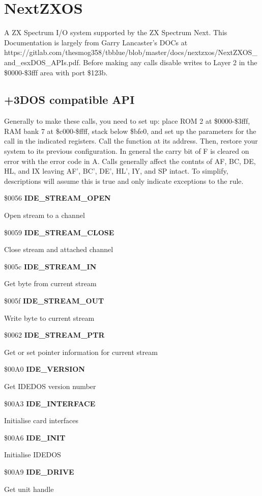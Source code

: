 \section{NextZXOS}
A ZX Spectrum I/O system supported by the ZX Spectrum Next. This
Documentation is largely from Garry Lancaster's DOCs at
https://gitlab.com/thesmog358/tbblue/blob/master/docs/nextzxos/NextZXOS\_and\_esxDOS\_APIs.pdf. Before
making any calls disable writes to Layer 2 in the \$0000-\$3fff area with port \$123b.

\subsection{+3DOS compatible API}
Generally to make these calls, you need to set up: place ROM 2 at
\$0000-\$3fff, RAM bank 7 at \$c000-\$ffff, stack below \$bfe0, and
set up the parameters for the call in the indicated registers. Call
the function at its address. Then, restore your system to its previous
configuration. In general the carry bit of F is cleared on error with
the error code in A. Calls generally affect the contnts of AF, BC, DE,
HL, and IX leaving AF', BC', DE', HL', IY, and SP intact. To simplify,
descriptions will assume this is true and only indicate exceptions to
the rule.

\$0056 \textbf{IDE\_STREAM\_OPEN}

Open stream to a channel

\$0059 \textbf{IDE\_STREAM\_CLOSE}

Close stream and attached channel

\$005c \textbf{IDE\_STREAM\_IN}

Get byte from current stream

\$005f \textbf{IDE\_STREAM\_OUT}

Write byte to current stream

\$0062 \textbf{IDE\_STREAM\_PTR}

Get or set pointer information for current stream

\$00A0 \textbf{IDE\_VERSION}

Get IDEDOS version number

\$00A3 \textbf{IDE\_INTERFACE}

Initialise card interfaces

\$00A6 \textbf{IDE\_INIT}

Initialise IDEDOS

\$00A9 \textbf{IDE\_DRIVE}

Get unit handle

